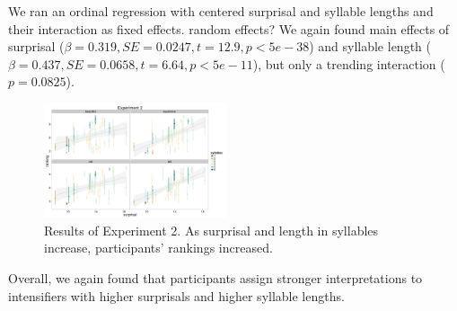 \documentclass[10pt,letterpaper]{article}
\newcommand{\todo}[1]{{\color{red}#1}}
\begin{document}
We ran an ordinal
regression with centered surprisal and syllable lengths and their interaction as fixed effects.
\todo{random effects?}
We again found main effects of surprisal ($\beta=0.319, SE=0.0247, t=12.9, p<5e-38$) and syllable length ($\beta=0.437, SE=0.0658, t=6.64, p<5e-11$), but only a trending interaction ($p=0.0825$).

\begin{figure}[ht]
\begin{center}
\includegraphics[width=0.48\textwidth]{analysis_files_for_writeup/images/exp2-plot.png}
\end{center}
\caption{Results of Experiment 2. As surprisal and length in syllables increase, participants' rankings increased.} 
\label{exp2-plot}
\end{figure}

Overall, we again found that participants assign stronger interpretations to intensifiers with higher surprisals and higher syllable lengths.
\end{document}
